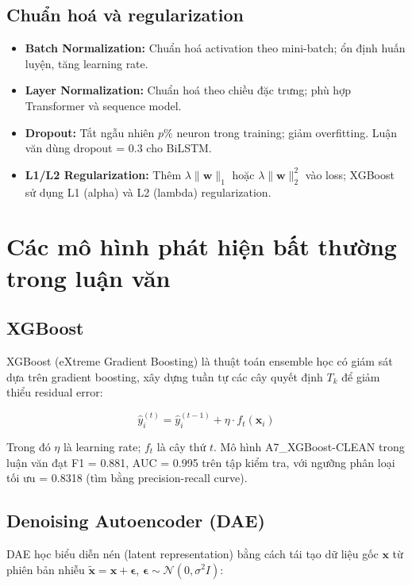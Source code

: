 \subsection{Chuẩn hoá và regularization}

\begin{itemize}
  \item \textbf{Batch Normalization:} Chuẩn hoá activation theo mini-batch; ổn định huấn luyện, tăng learning rate.
  \item \textbf{Layer Normalization:} Chuẩn hoá theo chiều đặc trưng; phù hợp Transformer và sequence model.
  \item \textbf{Dropout:} Tắt ngẫu nhiên $p\%$ neuron trong training; giảm overfitting. Luận văn dùng dropout = 0.3 cho BiLSTM.
  \item \textbf{L1/L2 Regularization:} Thêm $\lambda \|\mathbf{w}\|_1$ hoặc $\lambda \|\mathbf{w}\|_2^2$ vào loss; XGBoost sử dụng L1 (alpha) và L2 (lambda) regularization.
\end{itemize}

\section{Các mô hình phát hiện bất thường trong luận văn}

\subsection{XGBoost}

XGBoost (eXtreme Gradient Boosting) \cite{chen2016xgboost} là thuật toán ensemble học có giám sát dựa trên gradient boosting, xây dựng tuần tự các cây quyết định $T_k$ để giảm thiểu residual error:

\begin{equation}
  \hat{y}_i^{(t)} = \hat{y}_i^{(t-1)} + \eta \cdot f_t(\mathbf{x}_i)
  \label{eq:xgboost}
\end{equation}

Trong đó $\eta$ là learning rate; $f_t$ là cây thứ $t$. Mô hình A7\_XGBoost-CLEAN trong luận văn đạt F1 = 0.881, AUC = 0.995 trên tập kiểm tra, với ngưỡng phân loại tối ưu = 0.8318 (tìm bằng precision-recall curve).

\subsection{Denoising Autoencoder (DAE)}

DAE \cite{vincent2010stacked} học biểu diễn nén (latent representation) bằng cách tái tạo dữ liệu gốc $\mathbf{x}$ từ phiên bản nhiễu $\tilde{\mathbf{x}} = \mathbf{x} + \boldsymbol{\epsilon}$, $\boldsymbol{\epsilon} \sim \mathcal{N}(0, \sigma^2 I)$:

